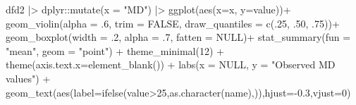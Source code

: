\documentclass[
  letterpaper,
  DIV=11,
  numbers=noendperiod]{scrreprt}
\newenvironment{Shaded}{\begin{snugshade}}{\end{snugshade}}
\newcommand{\AttributeTok}[1]{\textcolor[rgb]{0.40,0.45,0.13}{#1}}
\newcommand{\ConstantTok}[1]{\textcolor[rgb]{0.56,0.35,0.01}{#1}}
\newcommand{\DecValTok}[1]{\textcolor[rgb]{0.68,0.00,0.00}{#1}}
\newcommand{\FloatTok}[1]{\textcolor[rgb]{0.68,0.00,0.00}{#1}}
\newcommand{\FunctionTok}[1]{\textcolor[rgb]{0.28,0.35,0.67}{#1}}
\newcommand{\NormalTok}[1]{\textcolor[rgb]{0.00,0.23,0.31}{#1}}
\newcommand{\SpecialCharTok}[1]{\textcolor[rgb]{0.37,0.37,0.37}{#1}}
\newcommand{\StringTok}[1]{\textcolor[rgb]{0.13,0.47,0.30}{#1}}
\begin{document}
\begin{Shaded}
\begin{Highlighting}[]
\NormalTok{dfd2 }\SpecialCharTok{|\textgreater{}} 
\NormalTok{  dplyr}\SpecialCharTok{::}\FunctionTok{mutate}\NormalTok{(}\AttributeTok{x =} \StringTok{"MD"}\NormalTok{) }\SpecialCharTok{|\textgreater{}} 
  \FunctionTok{ggplot}\NormalTok{(}\FunctionTok{aes}\NormalTok{(}\AttributeTok{x=}\NormalTok{x, }\AttributeTok{y=}\NormalTok{value))}\SpecialCharTok{+}
    \FunctionTok{geom\_violin}\NormalTok{(}\AttributeTok{alpha =}\NormalTok{ .}\DecValTok{6}\NormalTok{, }\AttributeTok{trim =} \ConstantTok{FALSE}\NormalTok{, }\AttributeTok{draw\_quantiles =} \FunctionTok{c}\NormalTok{(.}\DecValTok{25}\NormalTok{, .}\DecValTok{50}\NormalTok{, .}\DecValTok{75}\NormalTok{))}\SpecialCharTok{+}
    \FunctionTok{geom\_boxplot}\NormalTok{(}\AttributeTok{width =}\NormalTok{ .}\DecValTok{2}\NormalTok{, }\AttributeTok{alpha =}\NormalTok{ .}\DecValTok{7}\NormalTok{, }\AttributeTok{fatten =} \ConstantTok{NULL}\NormalTok{)}\SpecialCharTok{+}
    \FunctionTok{stat\_summary}\NormalTok{(}\AttributeTok{fun =} \StringTok{"mean"}\NormalTok{, }\AttributeTok{geom =} \StringTok{"point"}\NormalTok{) }\SpecialCharTok{+}
  \FunctionTok{theme\_minimal}\NormalTok{(}\DecValTok{12}\NormalTok{) }\SpecialCharTok{+}
  \FunctionTok{theme}\NormalTok{(}\AttributeTok{axis.text.x=}\FunctionTok{element\_blank}\NormalTok{()) }\SpecialCharTok{+}
  \FunctionTok{labs}\NormalTok{(}\AttributeTok{x =} \ConstantTok{NULL}\NormalTok{, }\AttributeTok{y =} \StringTok{"Observed MD values"}\NormalTok{) }\SpecialCharTok{+}
  \FunctionTok{geom\_text}\NormalTok{(}\FunctionTok{aes}\NormalTok{(}\AttributeTok{label=}\FunctionTok{ifelse}\NormalTok{(value}\SpecialCharTok{\textgreater{}}\DecValTok{25}\NormalTok{,}\FunctionTok{as.character}\NormalTok{(name),}\StringTok{\textquotesingle{}\textquotesingle{}}\NormalTok{)),}\AttributeTok{hjust=}\SpecialCharTok{{-}}\FloatTok{0.3}\NormalTok{,}\AttributeTok{vjust=}\DecValTok{0}\NormalTok{)}
\end{Highlighting}
\end{Shaded}
\end{document}
